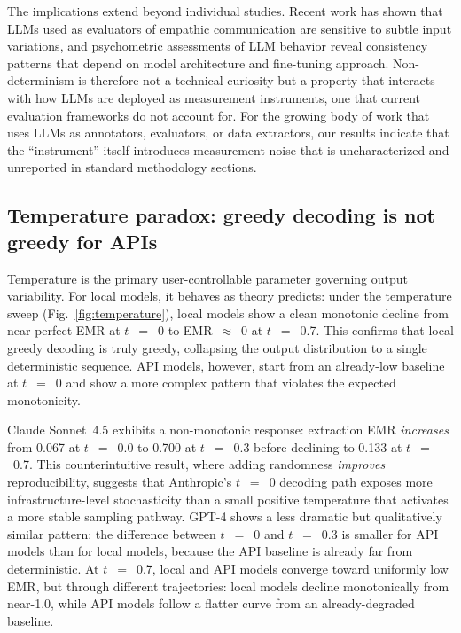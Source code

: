 \documentclass[sn-nature]{sn-jnl}
\begin{document}
The implications extend beyond individual studies.
Recent work has shown that LLMs used as evaluators of empathic communication are sensitive to subtle input variations\cite{kumar2026reliable}, and psychometric assessments of LLM behavior reveal consistency patterns that depend on model architecture and fine-tuning approach\cite{serapiogarcía2025psychometric}.
Non-determinism is therefore not a technical curiosity but a property that interacts with how LLMs are deployed as measurement instruments, one that current evaluation frameworks do not account for.
For the growing body of work that uses LLMs as annotators, evaluators, or data extractors, our results indicate that the ``instrument'' itself introduces measurement noise that is uncharacterized and unreported in standard methodology sections.


\subsection{Temperature paradox: greedy decoding is not greedy for APIs}\label{subsec:temperature}

Temperature is the primary user-controllable parameter governing output variability.
For local models, it behaves as theory predicts: under the temperature sweep (Fig.~\ref{fig:temperature}), local models show a clean monotonic decline from near-perfect EMR at $t$~$=$~0 to EMR~$\approx$~0 at $t$~$=$~0.7.
This confirms that local greedy decoding is truly greedy, collapsing the output distribution to a single deterministic sequence.
API models, however, start from an already-low baseline at $t$~$=$~0 and show a more complex pattern that violates the expected monotonicity.

Claude Sonnet~4.5 exhibits a non-monotonic response: extraction EMR \emph{increases} from 0.067 at $t$~$=$~0.0 to 0.700 at $t$~$=$~0.3 before declining to 0.133 at $t$~$=$~0.7.
This counterintuitive result, where adding randomness \emph{improves} reproducibility, suggests that Anthropic's $t$~$=$~0 decoding path exposes more infrastructure-level stochasticity than a small positive temperature that activates a more stable sampling pathway.
GPT-4 shows a less dramatic but qualitatively similar pattern: the difference between $t$~$=$~0 and $t$~$=$~0.3 is smaller for API models than for local models, because the API baseline is already far from deterministic.
At $t$~$=$~0.7, local and API models converge toward uniformly low EMR, but through different trajectories: local models decline monotonically from near-1.0, while API models follow a flatter curve from an already-degraded baseline.
\end{document}
